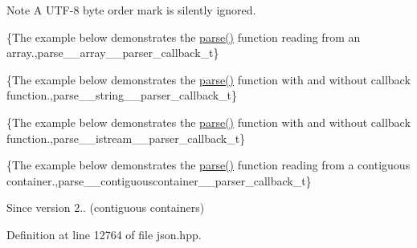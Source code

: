 \begin{DoxyNote}{Note}
A U\+T\+F-\/8 byte order mark is silently ignored.
\end{DoxyNote}
\{The example below demonstrates the {\ttfamily \hyperlink{classnlohmann_1_1basic__json_aa9676414f2e36383c4b181fe856aa3c0}{parse()}} function reading from an array.,parse\+\_\+\+\_\+array\+\_\+\+\_\+parser\+\_\+callback\+\_\+t\}

\{The example below demonstrates the {\ttfamily \hyperlink{classnlohmann_1_1basic__json_aa9676414f2e36383c4b181fe856aa3c0}{parse()}} function with and without callback function.,parse\+\_\+\+\_\+string\+\_\+\+\_\+parser\+\_\+callback\+\_\+t\}

\{The example below demonstrates the {\ttfamily \hyperlink{classnlohmann_1_1basic__json_aa9676414f2e36383c4b181fe856aa3c0}{parse()}} function with and without callback function.,parse\+\_\+\+\_\+istream\+\_\+\+\_\+parser\+\_\+callback\+\_\+t\}

\{The example below demonstrates the {\ttfamily \hyperlink{classnlohmann_1_1basic__json_aa9676414f2e36383c4b181fe856aa3c0}{parse()}} function reading from a contiguous container.,parse\+\_\+\+\_\+contiguouscontainer\+\_\+\+\_\+parser\+\_\+callback\+\_\+t\}

\begin{DoxySince}{Since}
version 2.. (contiguous containers) 
\end{DoxySince}


Definition at line 12764 of file json.\+hpp.

